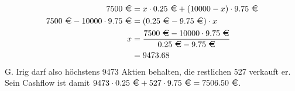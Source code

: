 \documentclass{article}
\begin{document}
\begin{enumerate}[label=(\alph*)]
		\begin{align}
			7500\text{ \EUR} &= x\cdot 0.25\text{ \EUR} + (10000-x)\cdot 9.75\text{ \EUR} \notag \\
			7500\text{ \EUR} - 10000\cdot 9.75\text{ \EUR} &= (0.25\text{ \EUR} - 9.75\text{ \EUR})\cdot x \notag \\
			x &= \frac{7500\text{ \EUR} - 10000\cdot 9.75\text{ \EUR}}{0.25\text{ \EUR} - 9.75\text{ \EUR}} \notag \\
			&= 9473.68 \notag
		\end{align}
		G. Irig darf also höchstens 9473 Aktien behalten, die restlichen 527 verkauft er. Sein Cashflow ist damit $9473\cdot 0.25\text{ \EUR} + 527\cdot 9.75\text{ \EUR} = 7506.50 \text{ \EUR}$.
	\end{enumerate}
	
	
\end{document}
